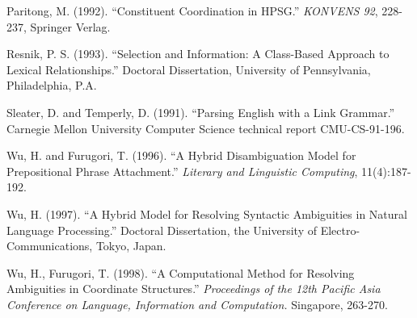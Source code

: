 \begin{thebibliography}{18}
 Paritong, M. (1992). ``Constituent Coordination in HPSG.''
{\it KONVENS 92}, 228-237, Springer Verlag.

 Resnik, P. S. (1993). ``Selection and Information: A
Class-Based Approach to Lexical Relationships.'' Doctoral Dissertation, 
University of Pennsylvania, Philadelphia, P.A.


 Sleater, D. and Temperly, D. (1991). ``Parsing English
with a Link Grammar.'' Carnegie Mellon University Computer Science 
technical report CMU-CS-91-196.


 Wu, H. and  Furugori, T. (1996). ``A Hybrid Disambiguation
Model for Prepositional Phrase Attachment.'' {\it Literary and Linguistic 
Computing}, 11(4):187-192.


 Wu, H. (1997). ``A Hybrid Model for Resolving Syntactic
Ambiguities in Natural Language Processing.'' Doctoral Dissertation, 
the University of Electro-Communications, Tokyo, Japan.

 Wu, H., Furugori, T. (1998). ``A Computational Method for 
Resolving Ambiguities in Coordinate Structures.'' {\it Proceedings
of the 12th Pacific Asia Conference on Language, Information and Computation.} 
Singapore, 263-270. 

\end{thebibliography}


